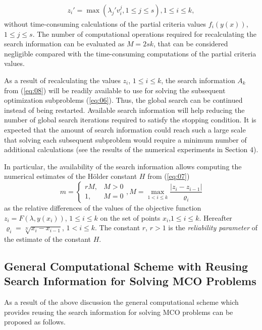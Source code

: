 \documentclass[smallcondensed]{svjour3}     %
\begin{document}
\begin{eqnarray} \label{eq:09}
z_i' = \max{(\lambda_j' v_i^j, 1 \leq j \leq s)},1 \leq i \leq k,
\end{eqnarray}
without time-consuming calculations of the partial criteria values $f_i (y(x))$, $1 \leq j \leq s$. The number of computational operations required for recalculating the search information can be evaluated as $M=2sk$, that can be considered negligible compared with the time-consuming computations of the partial criteria values.\par

As a result of recalculating the values $z_i$, $1 \leq i \leq k$, the search information $A_k$ from (\ref{eq:08}) will be readily available to use for solving the subsequent optimization subproblems (\ref{eq:06}). Thus, the global search can be continued instead of being restarted. Available search information will help reducing the number of global search iterations required to satisfy the stopping condition. It is expected that the amount of search information could reach such a large scale that solving each subsequent subproblem would require a minimum number of additional calculations (see the results of the numerical experiments in Section 4). \par

In particular, the availability of the search information allows computing the numerical estimates of the H\"{o}lder constant $H$ from (\ref{eq:07})
\begin{equation} \label{eq:10}
m = 
 \begin{cases}
   r M, & M > 0 \\
   1,   & M = 0
 \end{cases} ,
 M = \max_{1 < i \leq k} {\frac{|z_i - z_{i-1}|} {\varrho_i} }
\end{equation}
as the relative differences of the values of the objective function $z_i=F(\lambda,y(x_i))$, $1 \leq i \leq k$ on the set of points $x_i$,$1\leq i \leq k$. Hereafter $\varrho_i=\sqrt[N]{x_i - x_{i-1}}$, $1 < i \leq k$. The constant $r$, $r>1$ is the {\it reliability parameter} of the estimate of the constant $H$.

\subsection{General Computational Scheme with Reusing Search Information for Solving MCO Problems}
As a result of the above discussion the general computational scheme which provides reusing the search information for solving MCO problems can be proposed as follows.\par
\end{document}
